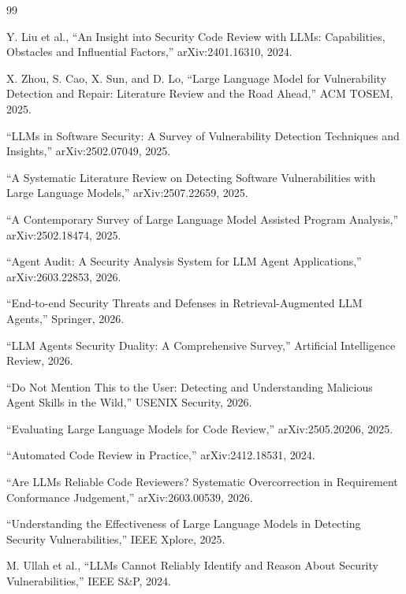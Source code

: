 \documentclass[11pt,a4paper,onecolumn]{article}
\begin{document}
\begin{thebibliography}{99}


Y. Liu et al., ``An Insight into Security Code Review with LLMs: Capabilities, Obstacles and Influential Factors,'' arXiv:2401.16310, 2024.

X. Zhou, S. Cao, X. Sun, and D. Lo, ``Large Language Model for Vulnerability Detection and Repair: Literature Review and the Road Ahead,'' ACM TOSEM, 2025.

``LLMs in Software Security: A Survey of Vulnerability Detection Techniques and Insights,'' arXiv:2502.07049, 2025.

``A Systematic Literature Review on Detecting Software Vulnerabilities with Large Language Models,'' arXiv:2507.22659, 2025.

``A Contemporary Survey of Large Language Model Assisted Program Analysis,'' arXiv:2502.18474, 2025.

``Agent Audit: A Security Analysis System for LLM Agent Applications,'' arXiv:2603.22853, 2026.

``End-to-end Security Threats and Defenses in Retrieval-Augmented LLM Agents,'' Springer, 2026.

``LLM Agents Security Duality: A Comprehensive Survey,'' Artificial Intelligence Review, 2026.

``Do Not Mention This to the User: Detecting and Understanding Malicious Agent Skills in the Wild,'' USENIX Security, 2026.

``Evaluating Large Language Models for Code Review,'' arXiv:2505.20206, 2025.

``Automated Code Review in Practice,'' arXiv:2412.18531, 2024.

``Are LLMs Reliable Code Reviewers? Systematic Overcorrection in Requirement Conformance Judgement,'' arXiv:2603.00539, 2026.

``Understanding the Effectiveness of Large Language Models in Detecting Security Vulnerabilities,'' IEEE Xplore, 2025.

M. Ullah et al., ``LLMs Cannot Reliably Identify and Reason About Security Vulnerabilities,'' IEEE S\&P, 2024.


\end{thebibliography}
\end{document}
